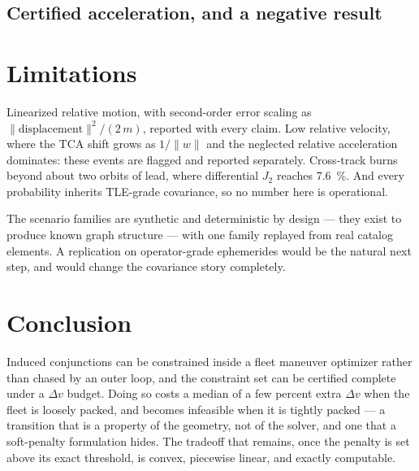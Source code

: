 \documentclass[11pt]{article}
\theoremstyle{definition}
\theoremstyle{remark}
\newcommand{\dv}{\Delta v}
\newcommand{\norm}[1]{\lVert #1 \rVert}
\begin{document}
\subsection{Certified acceleration, and a negative result}
\label{sec:results-accel}



\section{Limitations}

Linearized relative motion, with second-order error scaling as
$\norm{\text{displacement}}^2 / (2\,m)$, reported with every claim. Low relative
velocity, where the TCA shift grows as $1/\norm{w}$ and the neglected relative
acceleration dominates: these events are flagged and reported separately.
Cross-track burns beyond about two orbits of lead, where differential $J_2$
reaches \SI{7.6}{\percent}. And every probability inherits TLE-grade
covariance, so no number here is operational.

The scenario families are synthetic and deterministic by design --- they exist
to produce known graph structure --- with one family replayed from real
catalog elements. A replication on operator-grade ephemerides would be the
natural next step, and would change the covariance story completely.

\section{Conclusion}

Induced conjunctions can be constrained inside a fleet maneuver optimizer
rather than chased by an outer loop, and the constraint set can be certified
complete under a $\dv$ budget. Doing so costs a median of a few percent extra
$\dv$ when the fleet is loosely packed, and becomes infeasible when it is
tightly packed --- a transition that is a property of the geometry, not of the
solver, and one that a soft-penalty formulation hides. The tradeoff that
remains, once the penalty is set above its exact threshold, is convex,
piecewise linear, and exactly computable.
\end{document}
